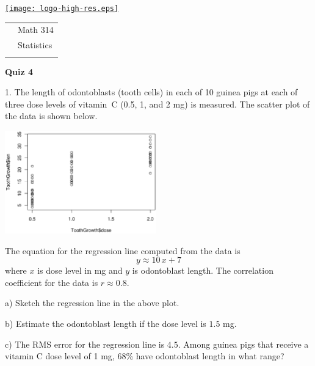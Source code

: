 \documentclass[10pt]{article}
\begin{document}
\pagestyle{empty}
\lstset{language=R, showspaces=false, showstringspaces=false}

\href{http://www.shepherd.edu}{\texttt{[image: logo-high-res.eps]}}
\vspace{-1.69cm}

{\small
\begin{tabular}{cl}
& Math 314\\
& Statistics\\
\hspace{5.28in} & %
\end{tabular}
}
\setlength{\baselineskip}{1.05\baselineskip}

\begin{center}
\textbf{\large  Quiz 4}
\end{center}
\medskip

1. The length of odontoblasts (tooth cells) in each of 10 guinea pigs 
at each of three dose levels of vitamin~C (0.5, 1, and 2 mg) 
is measured.  The scatter plot of the data is shown below.

\begin{center}
\includegraphics[height=1.75in,bb=0 22 515 340, clip]{teeth.eps}
\end{center}
The equation for the regression line computed from the data is 
\[y \approx 10\,x + 7\]
where $x$ is dose level in mg and $y$ is odontoblast length.
The correlation coefficient for the data is $r\approx 0.8$.

\hspace{20pt} a) Sketch the regression line in the above plot.
\medskip

\hspace{20pt} b) Estimate the odontoblast length if the dose level is $1.5$ mg.
\vspace{1.4in}

\hspace{20pt} c) The RMS error for the regression line is $4.5$.
Among guinea pigs that receive a vitamin C dose level of 1 mg, 68\% 
  have odontoblast length in what range?
\vspace{1.2in}
\end{document}

